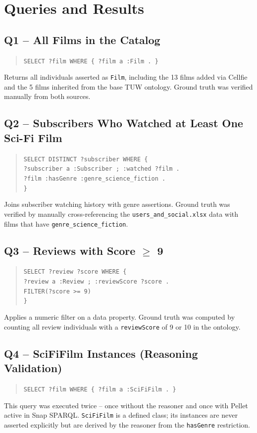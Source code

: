 \section*{Queries and Results}

\subsection*{Q1 -- All Films in the Catalog}
\begin{quote}\small
\texttt{SELECT ?film WHERE \{ ?film a :Film . \}}
\end{quote}
Returns all individuals asserted as \texttt{Film}, including the 13 films added via Cellfie and the 5 films inherited from the base TUW ontology. Ground truth was verified manually from both sources.

\subsection*{Q2 -- Subscribers Who Watched at Least One Sci-Fi Film}
\begin{quote}\small
\texttt{SELECT DISTINCT ?subscriber WHERE \{}\\
\texttt{\phantom{xx}?subscriber a :Subscriber ; :watched ?film .}\\
\texttt{\phantom{xx}?film :hasGenre :genre\_science\_fiction .}\\
\texttt{\}}
\end{quote}
Joins subscriber watching history with genre assertions. Ground truth was verified by manually cross-referencing the \texttt{users\_and\_social.xlsx} data with films that have \texttt{genre\_science\_fiction}.

\subsection*{Q3 -- Reviews with Score $\geq$ 9}
\begin{quote}\small
\texttt{SELECT ?review ?score WHERE \{}\\
\texttt{\phantom{xx}?review a :Review ; :reviewScore ?score .}\\
\texttt{\phantom{xx}FILTER(?score >= 9)}\\
\texttt{\}}
\end{quote}
Applies a numeric filter on a data property. Ground truth was computed by counting all review individuals with a \texttt{reviewScore} of 9 or 10 in the ontology.

\subsection*{Q4 -- SciFiFilm Instances (Reasoning Validation)}
\begin{quote}\small
\texttt{SELECT ?film WHERE \{ ?film a :SciFiFilm . \}}
\end{quote}
This query was executed twice -- once without the reasoner and once with Pellet active in Snap SPARQL. \texttt{SciFiFilm} is a defined class; its instances are never asserted explicitly but are derived by the reasoner from the \texttt{hasGenre} restriction.

